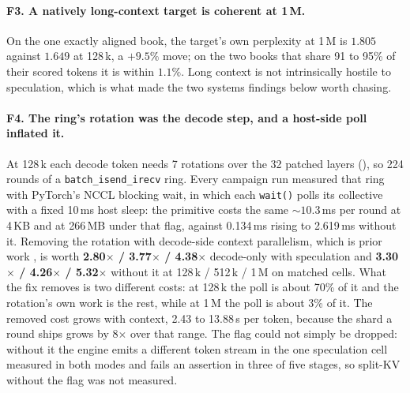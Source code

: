 \documentclass{article}
\begin{document}
\paragraph{F3. A natively long-context target is coherent at 1\,M.}
On the one exactly aligned book, the target's own perplexity at 1\,M is $1.805$ against
$1.649$ at 128\,k, a $+9.5\%$ move; on the two books that share 91 to 95\% of their scored
tokens it is within $1.1\%$. Long context is not intrinsically hostile to speculation, which
is what made the two systems findings below worth chasing.

\paragraph{F4. The ring's rotation was the decode step, and a host-side poll inflated it.}
At 128\,k each decode token needs 7 rotations over the 32 patched layers
(), so 224 rounds of a
\texttt{batch\_isend\_irecv} ring. Every campaign run measured that ring with PyTorch's NCCL
blocking wait, in which each \texttt{wait()} polls its collective with a fixed 10\,ms host
sleep: the primitive costs the same ${\sim}10.3$\,ms per round at 4\,KB and at 266\,MB under
that flag, against 0.134\,ms rising to 2.619\,ms without it. Removing the rotation with decode-side
context parallelism, which is prior work \citep{yang2024contextparallelism}, is worth
\textbf{2.80$\times$ / 3.77$\times$ / 4.38$\times$} decode-only with speculation and
\textbf{3.30$\times$ / 4.26$\times$ / 5.32$\times$} without it at 128\,k / 512\,k / 1\,M on
matched cells. What the fix removes is two different costs: at 128\,k the poll is about 70\% of
it and the rotation's own work is the rest, while at 1\,M the poll is about 3\% of it. The
removed cost grows with context, 2.43 to 13.88\,s per token, because the shard a round ships
grows by 8$\times$ over that range. The flag could not simply be dropped: without it the engine
emits a different token stream in the one speculation cell measured in both modes and fails an
assertion in three of five stages, so split-KV without the flag was not measured.
\end{document}
